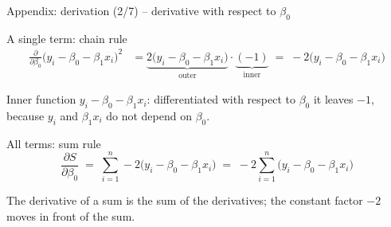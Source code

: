 \documentclass[aspectratio=169,11pt]{beamer}
\begin{document}
\begin{frame}{Appendix: derivation (2/7) -- derivative with respect to $\beta_0$}
  \begin{block}{A single term: chain rule}
    \begin{align*}
      \frac{\partial}{\partial \beta_0}\bigl(y_i - \beta_0 - \beta_1 x_i\bigr)^{2}
        &= \underbrace{2\bigl(y_i - \beta_0 - \beta_1 x_i\bigr)}_{\text{outer}}
           \cdot \underbrace{(-1)}_{\text{inner}}
         \;=\; -2\bigl(y_i - \beta_0 - \beta_1 x_i\bigr)
    \end{align*}
    \vspace{-10pt}

    \footnotesize Inner function $y_i - \beta_0 - \beta_1 x_i$: differentiated
    with respect to $\beta_0$ it leaves $-1$, because $y_i$ and $\beta_1 x_i$
    do not depend on $\beta_0$.
  \end{block}

  \medskip

  \begin{block}{All terms: sum rule}
    \[
      \frac{\partial S}{\partial \beta_0}
      \;=\; \sum_{i=1}^{n} -2\bigl(y_i - \beta_0 - \beta_1 x_i\bigr)
      \;=\; -2\sum_{i=1}^{n}\bigl(y_i - \beta_0 - \beta_1 x_i\bigr)
    \]
    \vspace{-8pt}

    \footnotesize The derivative of a sum is the sum of the derivatives; the
    constant factor $-2$ moves in front of the sum.
  \end{block}
\end{frame}
\end{document}
